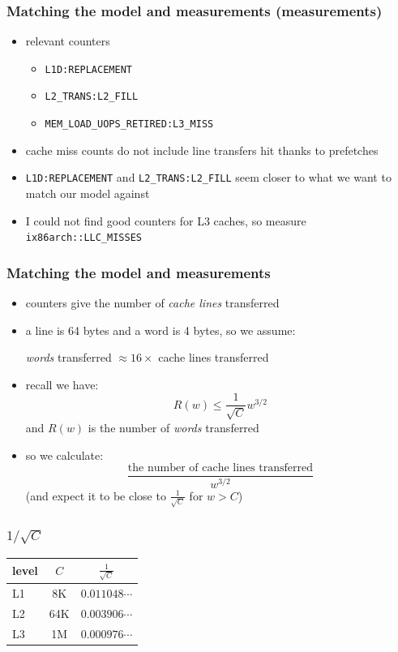 \documentclass[12pt,dvipdfmx]{beamer}
\newcommand{\ao}[1]{{\color{blue}#1}}
\begin{document}
\begin{frame}
\frametitle{Matching the model and measurements (measurements)}
\begin{itemize}
\item relevant counters
  \begin{itemize}
  \item {\tt L1D:REPLACEMENT}
  \item {\tt L2\_TRANS:L2\_FILL}
  \item {\tt MEM\_LOAD\_UOPS\_RETIRED:L3\_MISS}
  \end{itemize}

\item cache miss counts do not include line transfers 
  hit thanks to prefetches
\item {\tt L1D:REPLACEMENT} and {\tt L2\_TRANS:L2\_FILL} 
  seem closer to what we want to match our model against
\item I could not find good counters for L3 caches, so 
  measure {\tt ix86arch::LLC\_MISSES}
\end{itemize}
\end{frame}

\begin{frame}
\frametitle{Matching the model and measurements}
\begin{itemize}
\item counters give the number of \ao{\emph{cache lines}}
transferred
\item a line is 64 bytes and a word is 4 bytes, so we assume:

\ao{\emph{words}} transferred
$\approx 16 \times$ cache lines transferred

\item recall we have:
\[ R(w) \leq \frac{1}{\sqrt{C}} w^{3/2} \]
and $R(w)$ is the number of \ao{\emph{words}} transferred

\item so we calculate:
\[ \frac{\mbox{the number of cache lines transferred}}{w^{3/2}} \]
(and expect it to be close to ${\displaystyle{\frac{1}{\sqrt{C}}}}$
for $w > C$)

\end{itemize}
\end{frame}

\begin{frame}
\frametitle{${\displaystyle{1/\sqrt{C}}}$}
\begin{center}
\begin{tabular}{|l|c|c|}\hline
level & $C$ & $\frac{1}{\sqrt{C}}$ \\\hline
L1    & 8K  & $0.011048\cdots$ \\
L2    & 64K & $0.003906\cdots$ \\
L3    & 1M  & $0.000976\cdots$ \\\hline
\end{tabular}
\end{center}
\end{frame}
\end{document}
